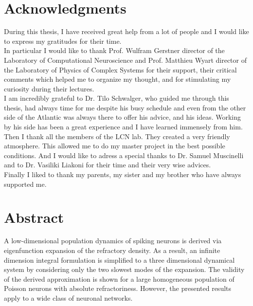 \documentclass[12pt,twoside]{report}
\begin{document}
\newpage\null\thispagestyle{empty}\newpage

\chapter*{Acknowledgments}
\thispagestyle{empty}
During this thesis, I have received great help from a lot of people and I would like to express my gratitudes for their time.\\
In particular I would like to thank Prof. Wulfram Gerstner director of the Laboratory of Computational Neuroscience and Prof. Matthieu Wyart director of the Laboratory of Physics of Complex Systems for their support, their critical comments which helped me to organize my thought, and for stimulating my curiosity during their lectures.\\
I am incredibly grateful to Dr. Tilo Schwalger, who guided me through this thesis, had always time for me despite his busy schedule and even from the other side of the Atlantic was always there to offer his advice, and his ideas. Working by his side has been a great experience and I have learned immensely from him. \\
Then I thank all the members of the LCN lab. They created a very friendly atmosphere. This allowed me to do my master project in the best possible conditions. And I would like to adress a special thanks to Dr. Samuel Muscinelli and to Dr. Vasiliki Liakoni for their time and their very wise advices.\\
Finally I liked to thank my parents, my sister and my brother who have always supported me.



\newpage\null\thispagestyle{empty}\newpage


\chapter*{Abstract}
\thispagestyle{empty}


A low-dimensional population dynamics of spiking neurons is derived via eigenfunction expansion of the refractory density. As a result, an infinite dimension integral formulation is simplified to a three dimensional dynamical system by considering only the two slowest modes of the expansion. The validity of the derived approximation is shown for a large homogeneous population of Poisson neurons with absolute refractoriness. However, the presented results apply to a wide class of neuronal networks.


\end{document}
